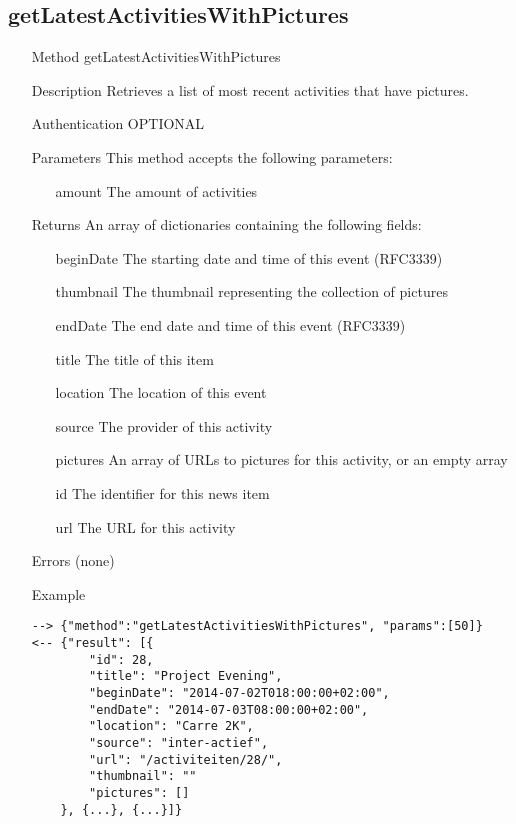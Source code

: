 \documentclass[a4paper]{scrreprt}
\begin{document}
\clearpage
\subsection{getLatestActivitiesWithPictures}
\begin{enumerate}
\item[Method] getLatestActivitiesWithPictures
\item[Description] Retrieves a list of most recent activities that have pictures.
\item[Authentication] OPTIONAL
\item[Parameters] This method accepts the following parameters:
\begin{enumerate}
	\item[amount] The amount of activities
    \end{enumerate}
\item[Returns] An array of dictionaries containing the following fields:
\begin{enumerate}
    \item[beginDate] The starting date and time of this event (RFC3339)
    \item[thumbnail] The thumbnail representing the collection of pictures
    \item[endDate] The end date and time of this event (RFC3339)
    \item[title] The title of this item
    \item[location] The location of this event
    \item[source] The provider of this activity
    \item[pictures] An array of URLs to pictures for this activity, or an empty array
    \item[id] The identifier for this news item
    \item[url] The URL for this activity
    \end{enumerate}
\item[Errors] (none)
\item[Example]
\begin{lstlisting}
--> {"method":"getLatestActivitiesWithPictures", "params":[50]}
<-- {"result": [{
        "id": 28,
        "title": "Project Evening",
        "beginDate": "2014-07-02T018:00:00+02:00",
        "endDate": "2014-07-03T08:00:00+02:00",
        "location": "Carre 2K",
        "source": "inter-actief",
        "url": "/activiteiten/28/",
        "thumbnail": ""
        "pictures": []
    }, {...}, {...}]}
\end{lstlisting}
\end{enumerate}
\end{document}
